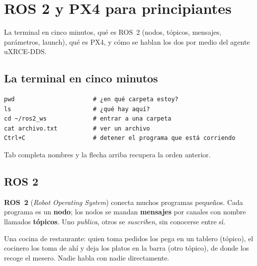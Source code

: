 \chapter{ROS 2 y PX4 para principiantes}

\begin{enpocas}
La terminal en cinco minutos, qué es ROS~2 (nodos, tópicos, mensajes, parámetros, launch), qué es PX4,
y cómo se hablan los dos por medio del agente uXRCE-DDS.
\end{enpocas}

\section{La terminal en cinco minutos}

\begin{lstlisting}[style=bash]
pwd                      # ¿en qué carpeta estoy?
ls                       # ¿qué hay aquí?
cd ~/ros2_ws             # entrar a una carpeta
cat archivo.txt          # ver un archivo
Ctrl+C                   # detener el programa que está corriendo
\end{lstlisting}

\begin{consejo}
Tab completa nombres y la flecha arriba recupera la orden anterior.
\end{consejo}

\section{ROS 2}

\textbf{ROS~2} (\emph{Robot Operating System}) conecta muchos programas pequeños. Cada programa es un
\textbf{nodo}; los nodos se mandan \textbf{mensajes} por canales con nombre llamados \textbf{tópicos}.
Uno \emph{publica}, otros se \emph{suscriben}, sin conocerse entre sí.

\begin{ejemplo}
Una cocina de restaurante: quien toma pedidos los pega en un tablero (tópico), el cocinero los toma
de ahí y deja los platos en la barra (otro tópico), de donde los recoge el mesero. Nadie habla con
nadie directamente.
\end{ejemplo}

